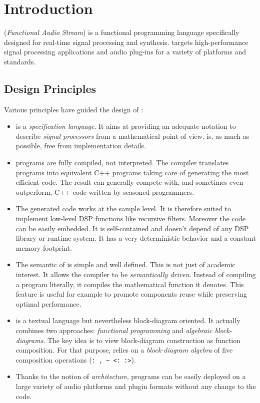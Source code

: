 \chapter{Introduction}
\label{Introduction}

\faust (\textit{Functional Audio Stream}) is a functional programming language specifically designed for real-time signal processing and synthesis.  \faust targets high-performance signal processing applications and audio plug-ins for a variety of platforms and standards. 

\section{Design Principles} 

Various principles have guided the design of \faust :

\begin{itemize}

\item \faust is a \textit{specification language}. It aims at providing an adequate notation to describe \textit{signal processors} from a mathematical point of view. \faust is, as much as possible, free from implementation details. 

\item \faust programs are fully compiled, not interpreted. The compiler translates \faust programs into equivalent C++ programs taking care of generating the most efficient code. The result can generally compete with, and sometimes even outperform, C++ code written by seasoned programmers. 

\item The generated code works at the sample level. It is therefore suited to implement low-level DSP functions like recursive filters. Moreover the code can be easily embedded. It is self-contained and doesn't depend of any DSP library or runtime system. It has a very deterministic behavior and a constant memory footprint. 

\item The semantic of \faust is simple and well defined. This is not just of academic interest. It allows the \faust compiler to be \emph{semantically driven}. Instead of compiling a program literally, it compiles the mathematical function it denotes. This feature is useful for example to promote components reuse while preserving optimal performance.  

\item \faust is a textual language but nevertheless block-diagram oriented. It actually combines two approaches: \textit{functional programming} and \textit{algebraic block-diagrams}. The key idea is to view block-diagram construction as function composition. For that purpose, \faust relies on a \emph{block-diagram algebra} of five composition operations (\lstinline': , ~ <: :>').

\item Thanks to the notion of \textit{architecture}, \faust programs can be easily deployed on a large variety of audio platforms and plugin formats without any change to the \faust code.

\end{itemize}

